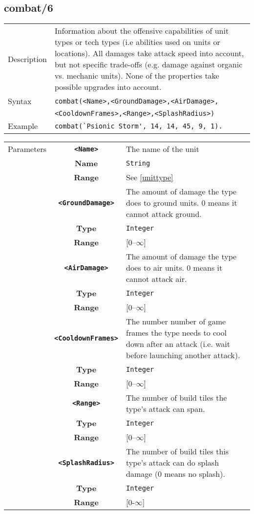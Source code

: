 \subsection{combat/6}
\begin{tabularx}{\textwidth}{lX}
 Description & Information about the offensive capabilities of unit types or tech types (i.e abilities used on units or locations). All damages take attack speed into account, but not specific trade-offs (e.g. damage against organic vs. mechanic units). None of the properties take possible upgrades into account. \\
 Syntax & \verb|combat(<Name>,<GroundDamage>,<AirDamage>,| \\ & \quad \verb|<CooldownFrames>,<Range>,<SplashRadius>)| \\
 Example & \verb|combat(`Psionic Storm', 14, 14, 45, 9, 1).| \\
 \end{tabularx}
 \begin{tabularx}{\textwidth}{l | c | p{8cm}|}
 \cline{2-3}
 Parameters & \textbf{\verb|<Name>|} & The name of the unit\\
            & \textbf{Name} & \verb|String| \\
            & \textbf{Range} & See \ref{unittype} \\
            \cline{2-3}
            & \textbf{\verb|<GroundDamage>|} & The amount of damage the type does to ground units. 0 means it cannot attack ground. \\
            & \textbf{Type} & \verb|Integer| \\
            & \textbf{Range} & [0--$\infty$] \\
            \cline{2-3}
            & \textbf{\verb|<AirDamage>|} & The amount of damage the type does to air units. 0 means it cannot attack air. \\
            & \textbf{Type} & \verb|Integer| \\
            & \textbf{Range} & [0--$\infty$] \\
            \cline{2-3}
            & \textbf{\verb|<CooldownFrames>|} & The number number of game frames the type needs to cool down after an attack (i.e. wait before launching another attack).\\
            & \textbf{Type} & \verb|Integer| \\
            & \textbf{Range} & [0--$\infty$] \\
            \cline{2-3}
            & \textbf{\verb|<Range>|} & The number of build tiles the type's attack can span. \\
            & \textbf{Type} & \verb|Integer| \\
            & \textbf{Range} & [0--$\infty$] \\
            \cline{2-3}
            & \textbf{\verb|<SplashRadius>|} & The number of build tiles this type's attack can do splash damage (0 means no splash).\\
            & \textbf{Type} & \verb|Integer| \\
            & \textbf{Range} & [0-$\infty$] \\
            \cline{2-3}
\end{tabularx}